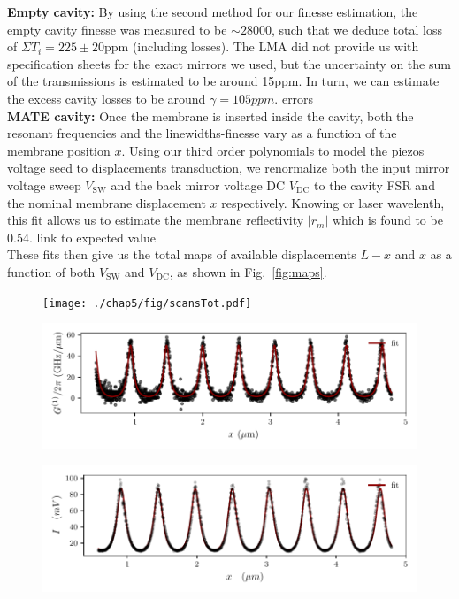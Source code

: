 \noindent \textbf{Empty cavity: }By using the second method for our finesse estimation, the empty cavity finesse was measured to be $\sim 28000$, such that we deduce total loss of $\Sigma T_i = 225 \pm 20$ppm  (including losses). The LMA did not provide us with specification sheets for the exact mirrors we used, but the uncertainty on the sum of the transmissions is estimated to be around 15ppm. In turn, we can estimate the excess cavity losses to be around $\gamma = 105ppm$. \color{red} errors \color{black} \\

\noindent \textbf{MATE cavity: }Once the membrane is inserted inside the cavity, both the resonant frequencies and the linewidths-finesse vary as a function of the membrane position $x$. Using our third order polynomials to model the piezos voltage seed to displacements transduction, we renormalize both the input mirror voltage sweep $V_{\text{SW}}$ and the back mirror voltage DC $V_{\text{DC}}$ to the cavity FSR and the nominal membrane displacement $x$ respectively. Knowing or laser wavelenth, this fit allows us to estimate the membrane reflectivity $|r_m|$ which is found to be 0.54. \color{red} link to expected value \color{black} \\ 

These fits then give us the total maps of available displacements $L-x$ and $x$ as a function of both $V_{\text{SW}}$ and $V_{\text{DC}}$, as shown in Fig.~\ref{fig:maps}. \\ 

\begin{figure}[h!]
    \centering  
    \texttt{[image: ./chap5/fig/scansTot.pdf]}
    \caption{ }
    \label{fig:tilt}
\end{figure}

\begin{figure}[h!]
    \centering  
    \includegraphics[width=\textwidth]{./chap5/fig/scancoupling.pdf}
    \caption{ }
    \label{fig:tilt}
\end{figure}

\begin{figure}[h!]
    \centering  
    \includegraphics[width=\textwidth]{./chap5/fig/scantrans.pdf}
    \caption{ }
    \label{fig:tilt}
\end{figure}

